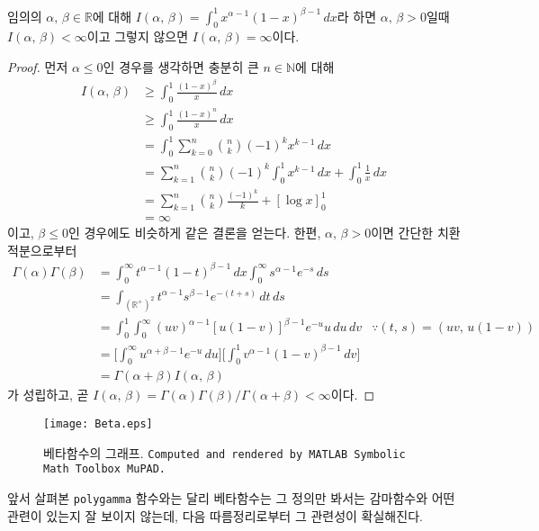 \begin{proposition}\label{prop:betaWellDefine}
    임의의 $\alpha,\,\beta\in\mathbb{R}$에 대해 $I(\alpha,\,\beta)=\int_0^1x^{\alpha-1}(1-x)^{\beta-1}\,dx$라 하면 $\alpha,\,\beta>0$일때 $I(\alpha,\,\beta)<\infty$이고 그렇지 않으면 $I(\alpha,\,\beta)=\infty$이다.
\end{proposition}

\begin{proof}
    먼저 $\alpha\leq0$인 경우를 생각하면 충분히 큰 $n\in\mathbb{N}$에 대해
    \begin{align*}
        I(\alpha,\,\beta)&\geq\int_0^1\frac{(1-x)^\beta}{x}\,dx\\
        &\geq\int_0^1\frac{(1-x)^n}{x}\,dx\\
        &=\int_0^1\sum_{k=0}^n\binom{n}{k}(-1)^kx^{k-1}\,dx\\
        &=\sum_{k=1}^n\binom{n}{k}(-1)^k\int_0^1x^{k-1}\,dx+\int_0^1\frac{1}{x}\,dx\\
        &=\sum_{k=1}^n\binom{n}{k}\frac{(-1)^k}{k}+[\log x]_0^1\\
        &=\infty
    \end{align*}
    이고, $\beta\leq0$인 경우에도 비슷하게 같은 결론을 얻는다. 한편, $\alpha,\,\beta>0$이면 간단한 치환적분으로부터
    \begin{align*}
        \Gamma(\alpha)\Gamma(\beta)&=\int_0^\infty t^{\alpha-1}(1-t)^{\beta-1}\,dx\int_0^\infty s^{\alpha-1}e^{-s}\,ds\\
        &=\int_{(\mathbb{R}^+)^2}t^{\alpha-1}s^{\beta-1}e^{-(t+s)}\,dt\,ds\\
        &=\int_0^1\int_0^\infty(uv)^{\alpha-1}[u(1-v)]^{\beta-1}e^{-u}u\,du\,dv&\because(t,\,s)=(uv,\,u(1-v))\\
        &=\bigg[\int_0^\infty u^{\alpha+\beta-1}e^{-u}\,du\bigg]\bigg[\int_0^1v^{\alpha-1}(1-v)^{\beta-1}\,dv\bigg]\\
        &=\Gamma(\alpha+\beta)I(\alpha,\,\beta)
    \end{align*}
    가 성립하고, 곧 $I(\alpha,\,\beta)=\Gamma(\alpha)\Gamma(\beta)/\Gamma(\alpha+\beta)<\infty$이다.
\end{proof}

\begin{figure}[!ht]
    \centering
    \texttt{[image: Beta.eps]}
    \caption{베타함수의 그래프. \texttt{Computed and rendered by MATLAB Symbolic Math Toolbox MuPAD.}}
\end{figure}

앞서 살펴본 \texttt{polygamma} 함수와는 달리 베타함수는 그 정의만 봐서는 감마함수와 어떤 관련이 있는지 잘 보이지 않는데, 다음 따름정리로부터 그 관련성이 확실해진다.

